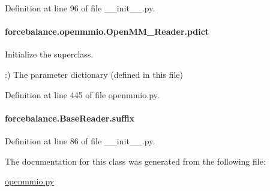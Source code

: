 Definition at line 96 of file \-\_\-\-\_\-init\-\_\-\-\_\-.\-py.

\hypertarget{classforcebalance_1_1openmmio_1_1OpenMM__Reader_a4fa2da992c7f0f525dcc465ffba69b86}{
\paragraph[{pdict}]{\setlength{\rightskip}{0pt plus 5cm}forcebalance.\-openmmio.\-Open\-M\-M\-\_\-\-Reader.\-pdict}}\label{classforcebalance_1_1openmmio_1_1OpenMM__Reader_a4fa2da992c7f0f525dcc465ffba69b86}


Initialize the superclass. 

\-:) The parameter dictionary (defined in this file) 

Definition at line 445 of file openmmio.\-py.

\hypertarget{classforcebalance_1_1BaseReader_a48ef0584a1b6b4b6f8eb741ad8465db8}{
\paragraph[{suffix}]{\setlength{\rightskip}{0pt plus 5cm}forcebalance.\-Base\-Reader.\-suffix\hspace{0.3cm}{\ttfamily [inherited]}}}\label{classforcebalance_1_1BaseReader_a48ef0584a1b6b4b6f8eb741ad8465db8}


Definition at line 86 of file \-\_\-\-\_\-init\-\_\-\-\_\-.\-py.



The documentation for this class was generated from the following file\-:\begin{DoxyCompactItemize}
\item 
\hyperlink{openmmio_8py}{openmmio.\-py}\end{DoxyCompactItemize}
